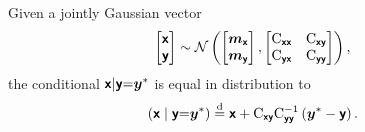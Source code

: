 \documentclass{article}
\begin{document}
\begin{lemma}
Given a jointly Gaussian vector
\begin{align}
    \begin{bmatrix} \boldsymbol{\mathsf{x}} \\ \boldsymbol{\mathsf{y}} \end{bmatrix}
    &\sim \mathcal{N}\left(\begin{bmatrix} \boldsymbol{m}_{\boldsymbol{\mathsf{x}}} \\ \boldsymbol{m}_{\boldsymbol{\mathsf{y}}} \end{bmatrix}, \begin{bmatrix} \mathrm{C}_{\boldsymbol{\mathsf{xx}}} & \mathrm{C}_{\boldsymbol{\mathsf{xy}}} \\ \mathrm{C}_{\boldsymbol{\mathsf{yx}}} & \mathrm{C}_{\boldsymbol{\mathsf{yy}}} \end{bmatrix}\right), \label{eq:joint-gaussian}
\end{align}
the conditional $\boldsymbol{\mathsf{x}} | \boldsymbol{\mathsf{y}} {=} \boldsymbol{y}^*$ is equal in distribution to
\begin{align}
    \left(\boldsymbol{\mathsf{x}} \mid \boldsymbol{\mathsf{y}} {=} \boldsymbol{y}^*\right)
    &\stackrel{\mathrm{d}}{=} \boldsymbol{\mathsf{x}} + \mathrm{C}_{\boldsymbol{\mathsf{xy}}} \mathrm{C}_{\boldsymbol{\mathsf{yy}}}^{-1} \left( \boldsymbol{y}^* - \boldsymbol{\mathsf{y}} \right).
    \label{eq:matheron-update}
\end{align}
\end{lemma}
\end{document}
